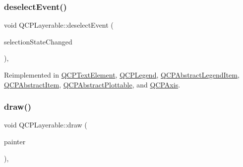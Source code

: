 \subsubsection{\texorpdfstring{deselectEvent()}{deselectEvent()}}
{\footnotesize\ttfamily void Q\+C\+P\+Layerable\+::deselect\+Event (\begin{DoxyParamCaption}\item[{bool $\ast$}]{selection\+State\+Changed }\end{DoxyParamCaption})\hspace{0.3cm}{\ttfamily [protected]}, {\ttfamily [virtual]}}



Reimplemented in \mbox{\hyperlink{class_q_c_p_text_element_a9a631a9deb9d82089a9d52de1744accf}{Q\+C\+P\+Text\+Element}}, \mbox{\hyperlink{class_q_c_p_legend_ac2066837f7ebc32a5b15434cdca5b176}{Q\+C\+P\+Legend}}, \mbox{\hyperlink{class_q_c_p_abstract_legend_item_aa1c0620558cc8e2a2e6fb7ab558f6097}{Q\+C\+P\+Abstract\+Legend\+Item}}, \mbox{\hyperlink{class_q_c_p_abstract_item_af9093798cb07a861dcc73f93ca16c0c1}{Q\+C\+P\+Abstract\+Item}}, \mbox{\hyperlink{class_q_c_p_abstract_plottable_a9b104d9da4f38f934363945c313bf82e}{Q\+C\+P\+Abstract\+Plottable}}, and \mbox{\hyperlink{class_q_c_p_axis_a5bc1f8a8d0fbc7658eba70c80279ed31}{Q\+C\+P\+Axis}}.

\mbox{\label{class_q_c_p_layerable_aecf2f7087482d4b6a78cb2770e5ed12d}} 
\subsubsection{\texorpdfstring{draw()}{draw()}}
{\footnotesize\ttfamily void Q\+C\+P\+Layerable\+::draw (\begin{DoxyParamCaption}\item[{\mbox{\hyperlink{class_q_c_p_painter}{Q\+C\+P\+Painter}} $\ast$}]{painter }\end{DoxyParamCaption})\hspace{0.3cm}{\ttfamily [protected]}, {}}



